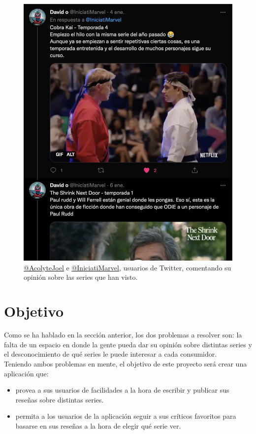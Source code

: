 \begin{figure}[H]
    \includegraphics[scale=0.253]{img/twitter-thread-2.png}
	\caption{ \href{https://twitter.com/AcolyteJoel}{@AcolyteJoel} e \href{https://twitter.com/IniciatiMarvel}{@IniciatiMarvel}, usuarios de Twitter, comentando su opinión sobre las series que han visto. }
    \label{fig:twitter_threads}
\end{figure}

\section{Objetivo}\label{sec:objetivo}
Como se ha hablado en la sección anterior, los dos problemas a resolver son: la falta de un espacio en donde la gente pueda dar su opinión sobre distintas series y el desconocimiento de qué series le puede interesar a cada consumidor.\\

Teniendo ambos problemas en mente, el objetivo de este proyecto será crear una aplicación que:
\begin{itemize}
    \item provea a sus usuarios de facilidades a la hora de escribir y publicar sus reseñas sobre distintas series.
    \item permita a los usuarios de la aplicación seguir a sus críticos favoritos para basarse en sus reseñas a la hora de elegir qué serie ver.
\end{itemize}
